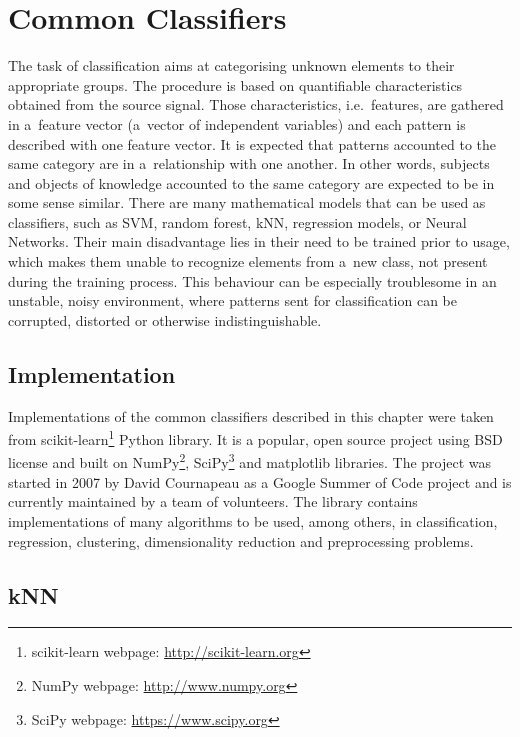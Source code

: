 
\chapter{Common Classifiers}
\label{common_classifiers}

The task of classification aims at categorising unknown elements to their appropriate groups. The procedure is based on quantifiable characteristics obtained from the source signal. Those characteristics, i.e.~features, are gathered in a~feature vector (a~vector of independent variables) and each pattern is described with one feature vector. It is expected that patterns accounted to the same category are in a~relationship with one another. In other words, subjects and objects of knowledge accounted to the same category are expected to be in some sense similar. There are many mathematical models that can be used as classifiers, such as SVM, random forest, kNN, regression models, or Neural Networks. Their main disadvantage lies in their need to be trained prior to usage, which makes them unable to recognize elements from a~new class, not present during the training process. This behaviour can be especially troublesome in an unstable, noisy environment, where patterns sent for classification can be corrupted, distorted or otherwise indistinguishable.

\section{Implementation}

Implementations of the common classifiers described in this chapter were taken from scikit-learn\footnote{scikit-learn webpage: \href{http://scikit-learn.org/}{http://scikit-learn.org}} Python library\cite{Pedregosa2011}. It is a popular, open source project using BSD license and built on NumPy\footnote{NumPy webpage: \href{http://www.numpy.org/}{http://www.numpy.org}}, SciPy\footnote{SciPy webpage: \href{https://www.scipy.org/}{https://www.scipy.org}} and matplotlib libraries. The project was started in 2007 by David Cournapeau as a Google Summer of Code project and is currently maintained by a team of volunteers. The library contains implementations of many algorithms to be used, among others, in classification, regression, clustering, dimensionality reduction and preprocessing problems.

\section{kNN}

